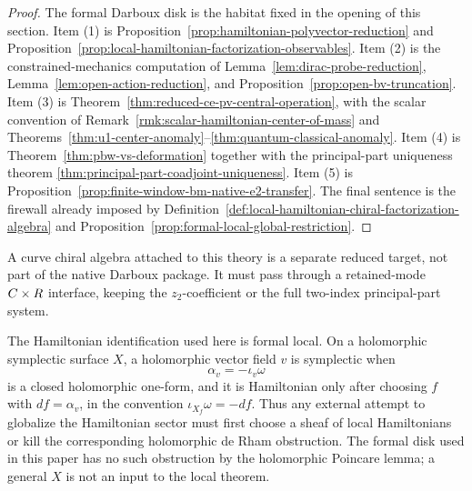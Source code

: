 \documentclass[11pt]{memoir}
\begin{document}
\begin{proof}
  The formal Darboux disk is the habitat fixed in the opening of this
  section.  Item (1) is
  Proposition~\ref{prop:hamiltonian-polyvector-reduction} and
  Proposition~\ref{prop:local-hamiltonian-factorization-observables}.
  Item (2) is the constrained-mechanics computation of
  Lemma~\ref{lem:dirac-probe-reduction},
  Lemma~\ref{lem:open-action-reduction}, and
  Proposition~\ref{prop:open-bv-truncation}.  Item (3) is
  Theorem~\ref{thm:reduced-ce-pv-central-operation}, with the scalar
  convention of Remark~\ref{rmk:scalar-hamiltonian-center-of-mass} and
  Theorems~\ref{thm:u1-center-anomaly}--\ref{thm:quantum-classical-anomaly}.
  Item (4) is Theorem~\ref{thm:pbw-vs-deformation} together with the
  principal-part uniqueness theorem
  \ref{thm:principal-part-coadjoint-uniqueness}.  Item (5) is
  Proposition~\ref{prop:finite-window-bm-native-e2-transfer}.  The final sentence is
  the firewall already imposed by
  Definition~\ref{def:local-hamiltonian-chiral-factorization-algebra} and
  Proposition~\ref{prop:formal-local-global-restriction}.
\end{proof}

\begin{rmk}\label{rmk:constructed-chiral-interface-target}
  A curve chiral algebra attached to this theory is a separate reduced
  target, not part of the native Darboux package.  It must pass through a
  retained-mode \(C\times R\) interface, keeping the \(z_2\)-coefficient
  or the full two-index principal-part system.
\end{rmk}

\begin{rmk}
  The Hamiltonian identification used here is formal local. On a holomorphic
  symplectic surface $X$, a holomorphic vector field $v$ is symplectic when
  $$\alpha_v=-\iota_v\omega$$
  is a closed holomorphic one-form, and it is Hamiltonian only after
  choosing $f$ with $df=\alpha_v$, in the convention
  $\iota_{X_f}\omega=-df$. Thus any external attempt to globalize the
  Hamiltonian sector must first choose a sheaf of local Hamiltonians or
  kill the corresponding holomorphic de Rham obstruction. The formal disk
  used in this paper has no such obstruction by the holomorphic Poincare
  lemma; a general $X$ is not an input to the local theorem.
\end{rmk}
\end{document}
